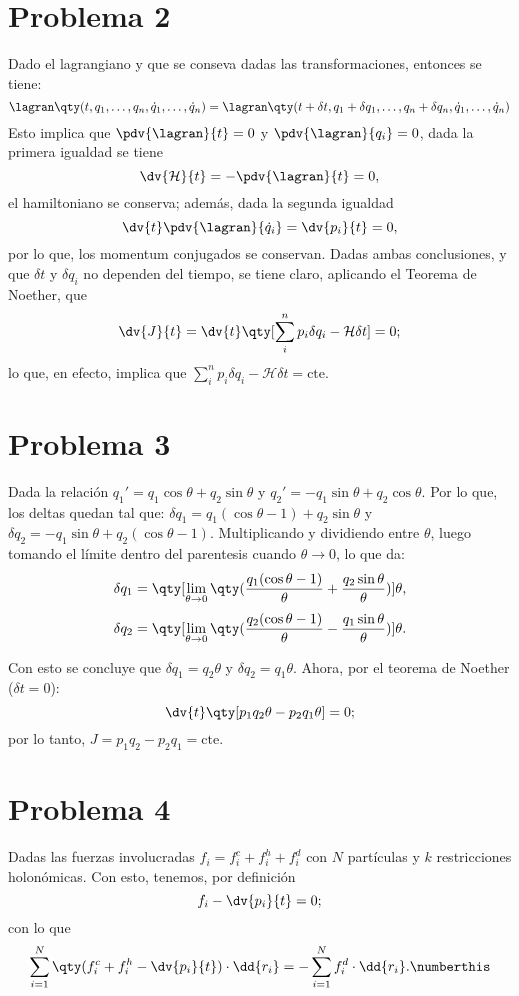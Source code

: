\section{Problema 2}
Dado el lagrangiano y que se conseva dadas las transformaciones, entonces se tiene:
\begin{displaymath}
	\lagran \qty(t,q_1,\ldots ,q_n ,\dot{q}_1, \ldots ,\dot{q}_n) = \lagran \qty(t + \delta t,q_1 + \delta q_1,\ldots ,q_n + \delta q_n ,\dot{q}_1, \ldots ,\dot{q}_n)
\end{displaymath}
Esto implica que $\pdv{\lagran}{t} = 0$ y $\pdv{\lagran}{q_i} = 0$, dada la primera igualdad se tiene
	$$\dv{\mathcal{H}}{t} = -\pdv{\lagran}{t} = 0,$$
el hamiltoniano se conserva; además, dada la segunda igualdad
	$$\dv{t} \pdv{\lagran}{\dot{q}_i} = \dv{p_i}{t} = 0,$$
por lo que, los momentum conjugados se conservan. Dadas ambas conclusiones, y que $\delta t$ y $\delta q_i$ no dependen del tiempo, se tiene claro, aplicando el Teorema de Noether, que
	$$\dv{J}{t} = \dv{t} \qty[\sum_i ^n p_i \delta q_i - \mathcal{H}\delta t] = 0;$$
lo que, en efecto, implica que $\displaystyle\sum_i ^n p_i \delta q_i - \mathcal{H}\delta t = \text{cte}$. 


\section{Problema 3}
Dada la relación $q_1 ' = q_1 \cos{\theta} + q_2 \sin{\theta}$ y $q_2 ' = -q_1 \sin{\theta} + q_2 \cos{\theta}$. Por lo que, los deltas quedan tal que: $\delta q_1 = q_1 (\cos{\theta} - 1) + q_2 \sin{\theta}$ y $\delta q_2 = -q_1 \sin{\theta} + q_2 (\cos{\theta} - 1)$. Multiplicando y dividiendo entre $\theta$, luego tomando el límite dentro del parentesis cuando $\theta \to 0$, lo que da:
	$$\delta q_1 = \qty[\lim_{\theta \to 0} \qty(\frac{q_1 (\cos{\theta} - 1)}{\theta} + \frac{q_2 \sin{\theta}}{\theta})] \theta ,$$
	$$\delta q_2 = \qty[\lim_{\theta \to 0} \qty(\frac{q_2 (\cos{\theta} - 1)}{\theta} - \frac{q_1 \sin{\theta}}{\theta})] \theta.$$

Con esto se concluye que $\delta q_1 = q_2 \theta$ y $\delta q_2 = q_1 \theta$. Ahora, por el teorema de Noether ($\delta t = 0$):
	$$\dv{t} \qty[p_1 q_2 \theta - p_2 q_1 \theta] = 0;$$
por lo tanto, $J = p_1 q_2 - p_2 q_1 = \text{cte}.$


\section{Problema 4}
Dadas las fuerzas involucradas $f_i = f^c _i + f^h _i + f^d _i$ con $N$ partículas y $k$ restricciones holonómicas. Con esto, tenemos, por definición
	$$f_i - \dv{p_i}{t} = 0;$$
con lo que
\begin{displaymath}
	\sum _{i=1} ^N \qty(f^c _i + f^h _i - \dv{p_i}{t}) \cdot \dd{r_i} = -\sum _{i=1} ^N f_i ^d \cdot \dd{r_i}. \numberthis \label{main}
\end{displaymath}

